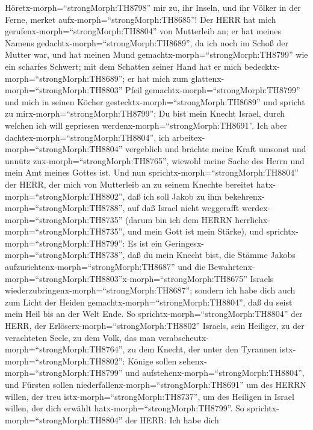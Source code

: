  Höretx-morph=``strongMorph:TH8798'' mir zu, ihr Inseln, und
ihr Völker in der Ferne, merket aufx-morph=``strongMorph:TH8685''! Der
HERR hat mich gerufenx-morph=``strongMorph:TH8804'' von Mutterleib an;
er hat meines Namens gedachtx-morph=``strongMorph:TH8689'', da ich noch
im Schoß der Mutter war,  und hat meinen Mund
gemachtx-morph=``strongMorph:TH8799'' wie ein scharfes Schwert; mit dem
Schatten seiner Hand hat er mich bedecktx-morph=``strongMorph:TH8689'';
er hat mich zum glattenx-morph=``strongMorph:TH8803'' Pfeil
gemachtx-morph=``strongMorph:TH8799'' und mich in seinen Köcher
gestecktx-morph=``strongMorph:TH8689''  und spricht zu
mirx-morph=``strongMorph:TH8799'': Du bist mein Knecht Israel, durch
welchen ich will gepriesen werdenx-morph=``strongMorph:TH8691''.
 Ich aber dachtex-morph=``strongMorph:TH8804'', ich
arbeitex-morph=``strongMorph:TH8804'' vergeblich und brächte meine Kraft
umsonst und unnütz zux-morph=``strongMorph:TH8765'', wiewohl meine Sache
des Herrn und mein Amt meines Gottes ist.  Und nun
sprichtx-morph=``strongMorph:TH8804'' der HERR, der mich von Mutterleib
an zu seinem Knechte bereitet hatx-morph=``strongMorph:TH8802'', daß ich
soll Jakob zu ihm bekehrenx-morph=``strongMorph:TH8788'', auf daß Israel
nicht weggerafft werdex-morph=``strongMorph:TH8735'' (darum bin ich dem
HERRN herrlichx-morph=``strongMorph:TH8735'', und mein Gott ist mein
Stärke),  und sprichtx-morph=``strongMorph:TH8799'': Es ist
ein Geringesx-morph=``strongMorph:TH8738'', daß du mein Knecht bist, die
Stämme Jakobs aufzurichtenx-morph=``strongMorph:TH8687'' und die
Bewahrtenx-morph=``strongMorph:TH8803''\textbar x-morph=``strongMorph:TH8675''
Israels wiederzubringenx-morph=``strongMorph:TH8687''; sondern ich habe
dich auch zum Licht der Heiden gemachtx-morph=``strongMorph:TH8804'',
daß du seist mein Heil bis an der Welt Ende.  So
sprichtx-morph=``strongMorph:TH8804'' der HERR, der
Erlöserx-morph=``strongMorph:TH8802'' Israels, sein Heiliger, zu der
verachteten Seele, zu dem Volk, das man
verabscheutx-morph=``strongMorph:TH8764'', zu dem Knecht, der unter den
Tyrannen istx-morph=``strongMorph:TH8802'': Könige sollen
sehenx-morph=``strongMorph:TH8799'' und
aufstehenx-morph=``strongMorph:TH8804'', und Fürsten sollen
niederfallenx-morph=``strongMorph:TH8691'' um des HERRN willen, der treu
istx-morph=``strongMorph:TH8737'', um des Heiligen in Israel willen, der
dich erwählt hatx-morph=``strongMorph:TH8799''.  So
sprichtx-morph=``strongMorph:TH8804'' der HERR: Ich habe dich
